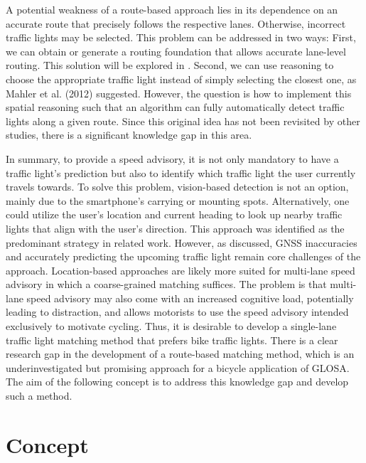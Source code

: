 A potential weakness of a route-based approach lies in its dependence on an accurate route that precisely follows the respective lanes. Otherwise, incorrect traffic lights may be selected. This problem can be addressed in two ways: First, we can obtain or generate a routing foundation that allows accurate lane-level routing. This solution will be explored in  . Second, we can use reasoning to choose the appropriate traffic light instead of simply selecting the closest one, as Mahler et al. (2012) \cite{mahler_reducing_2012} suggested. However, the question is how to implement this spatial reasoning such that an algorithm can fully automatically detect traffic lights along a given route. Since this original idea has not been revisited by other studies, there is a significant knowledge gap in this area.

\begin{Summary}
In summary, to provide a speed advisory, it is not only mandatory to have a traffic light's prediction but also to identify which traffic light the user currently travels towards. To solve this problem, vision-based detection is not an option, mainly due to the smartphone's carrying or mounting spots. Alternatively, one could utilize the user's location and current heading to look up nearby traffic lights that align with the user's direction. This approach was identified as the predominant strategy in related work. However, as discussed, GNSS inaccuracies and accurately predicting the upcoming traffic light remain core challenges of the approach. Location-based approaches are likely more suited for multi-lane speed advisory in which a coarse-grained matching suffices. The problem is that multi-lane speed advisory may also come with an increased cognitive load, potentially leading to distraction, and allows motorists to use the speed advisory intended exclusively to motivate cycling. Thus, it is desirable to develop a single-lane traffic light matching method that prefers bike traffic lights. There is a clear research gap in the development of a route-based matching method, which is an underinvestigated but promising approach for a bicycle application of GLOSA. The aim of the following concept is to address this knowledge gap and develop such a method.
\end{Summary}

\section{Concept}

